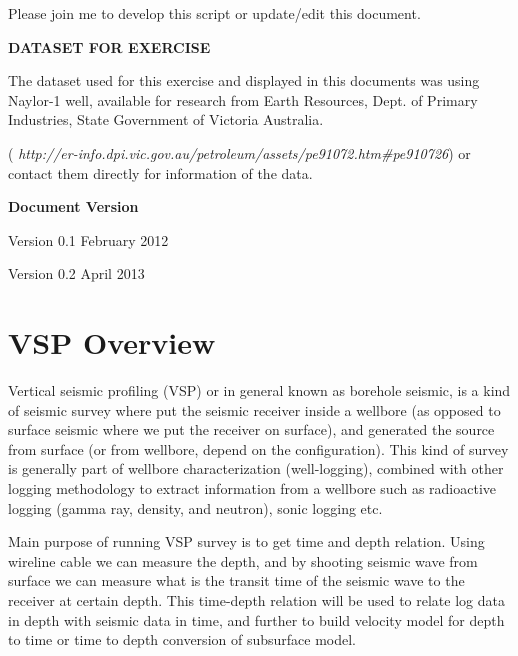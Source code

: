 \documentclass{article}
\begin{document}
\vspace{24pt}
Please join me to develop this script or update/edit this document. 

\vspace{24pt}
\textbf{DATASET FOR EXERCISE}

\vspace{24pt}
The dataset used for this exercise and displayed in this documents was using Naylor-1 
well, available for research from Earth Resources, Dept. of Primary Industries, 
State Government of Victoria Australia. 

\vspace{12pt}
({\color{color02} \emph{http://er-info.dpi.vic.gov.au/petroleum/assets/pe91072.htm\#pe910726}}) 
or contact them directly for information of the data.

\vspace{24pt}
\textbf{Document Version}

\vspace{12pt}
Version 0.1  February 2012

\vspace{12pt}
Version 0.2 April 2013\newpage

\newpage
\vspace{36pt}
\section*{{\LARGE{}\textbf{VSP Overview}}}

\vspace{24pt}
Vertical seismic profiling (VSP) or in general known as borehole seismic, is a 
kind of seismic survey where put the seismic receiver inside a wellbore (as opposed 
to surface seismic where we put the receiver on surface), and generated the source 
from surface (or from wellbore, depend on the configuration). This kind of survey 
is generally part of wellbore characterization (well-logging), combined with other 
logging methodology to extract information from a wellbore such as radioactive 
logging (gamma ray, density, and neutron), sonic logging etc.

\vspace{24pt}
Main purpose of running VSP survey is to get time and depth relation. Using wireline 
cable we can measure the depth, and by shooting seismic wave from surface we can 
measure what is the transit time of the seismic wave to the receiver at certain 
depth. This time-depth relation will be used to relate log data in depth with seismic 
data in time, and further to build velocity model for depth to time or time to 
depth conversion of subsurface model. 
\end{document}
